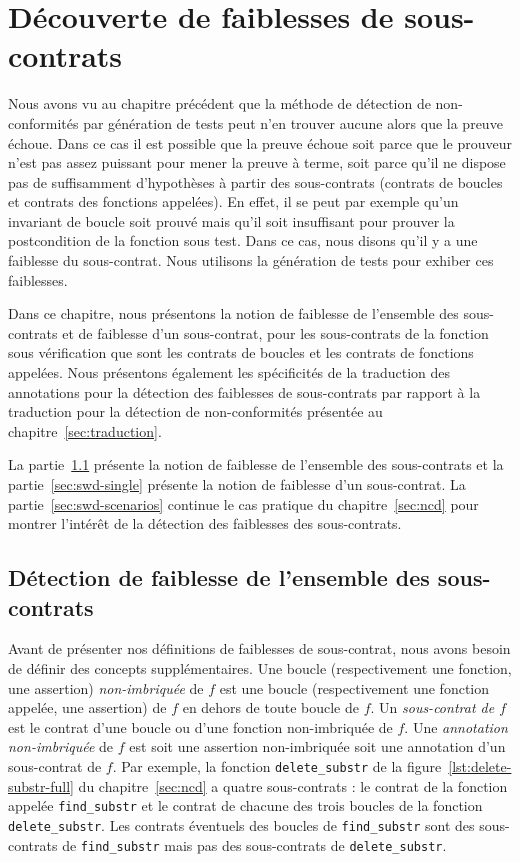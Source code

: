 
\chapter{Découverte de faiblesses de sous-contrats}
\label{sec:swd}

\chapterintro

Nous avons vu au chapitre précédent que la méthode de détection de
non-conformités par génération de tests peut n'en trouver aucune alors que la
preuve échoue.
Dans ce cas il est possible que la preuve échoue soit parce que le prouveur
n'est pas assez puissant pour mener la preuve à terme, soit parce qu'il ne
dispose pas de suffisamment d'hypothèses à partir des sous-contrats (contrats
de boucles et contrats des fonctions appelées).
En effet, il se peut par exemple qu'un invariant de boucle soit prouvé mais
qu'il soit insuffisant pour prouver la postcondition de la fonction sous test.
Dans ce cas, nous disons qu'il y a une faiblesse du sous-contrat.
Nous utilisons la génération de tests pour exhiber ces faiblesses.

Dans ce chapitre, nous présentons la notion de faiblesse de l'ensemble des
sous-contrats et de faiblesse d'un sous-contrat, pour les sous-contrats de la
fonction sous vérification que sont les contrats de boucles et les contrats
de fonctions appelées.
Nous présentons également les spécificités de la traduction des annotations pour
la détection des faiblesses de sous-contrats par rapport à la traduction pour la
détection de non-conformités présentée au chapitre~\ref{sec:traduction}.

La partie~\ref{sec:swd-global} présente la notion de faiblesse de l'ensemble des
sous-contrats et la partie~\ref{sec:swd-single} présente la notion de faiblesse
d'un sous-contrat.
La partie~\ref{sec:swd-scenarios} continue le cas pratique du
chapitre~\ref{sec:ncd} pour montrer l'intérêt de la détection des faiblesses
des sous-contrats.


\section{Détection de faiblesse de l'ensemble des sous-contrats}
\label{sec:swd-global}


Avant de présenter nos définitions de faiblesses de sous-contrat, nous avons
besoin de définir des concepts supplémentaires.
Une boucle (respectivement une fonction, une assertion) \emph{non-imbriquée} de
$f$ est une boucle (respectivement une fonction appelée, une assertion) de $f$
en dehors de toute boucle de $f$.
Un \emph{sous-contrat de $f$} est le contrat d'une boucle ou d'une fonction
non-imbriquée de $f$.
Une \emph{annotation non-imbriquée} de $f$ est soit une assertion non-imbriquée
soit une annotation d'un sous-contrat de $f$.
Par exemple, la fonction \lstinline'delete_substr' de la
figure~\ref{lst:delete-substr-full} du chapitre~\ref{sec:ncd} a quatre
sous-contrats : le contrat de la fonction appelée \lstinline'find_substr' et le
contrat de chacune des trois boucles de la fonction \lstinline'delete_substr'.
Les contrats éventuels des boucles de \lstinline'find_substr' sont des
sous-contrats de \lstinline'find_substr' mais pas des sous-contrats de
\lstinline'delete_substr'.

